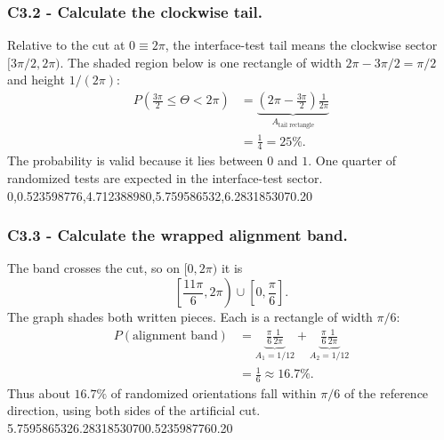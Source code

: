 	\subsubsection*{C3.2 - Calculate the clockwise tail.}
	\label{subsec:c3-uniform-sensor-b}
	Relative to the cut at $0\equiv2\pi$, the interface-test tail means the
	clockwise sector $[3\pi/2,2\pi)$.  The shaded region below is one rectangle of
	width $2\pi-3\pi/2=\pi/2$ and height $1/(2\pi)$:
	\[
	\begin{aligned}
		P\left(\frac{3\pi}{2}\le\Theta<2\pi\right)
		&=\underbrace{\left(2\pi-\frac{3\pi}{2}\right)
			\frac1{2\pi}}_{A_{\text{tail rectangle}}}\\
		&=\frac14=25\%.
	\end{aligned}
	\]
	The probability is valid because it lies between $0$ and $1$.  One quarter of
	randomized tests are expected in the interface-test sector.
	\begingroup
	{0,0.523598776,4.712388980,5.759586532,6.283185307}{0.20}
	\endgroup
	
	\subsubsection*{C3.3 - Calculate the wrapped alignment band.}
	\label{subsec:c3-uniform-sensor-c}
	The band crosses the cut, so on $[0,2\pi)$ it is
	\[
	\left[\frac{11\pi}{6},2\pi\right)
	\cup\left[0,\frac\pi6\right].
	\]
	The graph shades both written pieces.  Each is a rectangle of width $\pi/6$:
	\[
	\begin{aligned}
		P(\text{alignment band})
		&=\underbrace{\frac\pi6\frac1{2\pi}}_{A_1=1/12}
		+\underbrace{\frac\pi6\frac1{2\pi}}_{A_2=1/12}\\
		&=\frac16\approx16.7\%.
	\end{aligned}
	\]
	Thus about $16.7\%$ of randomized orientations fall within $\pi/6$ of the
	reference direction, using both sides of the artificial cut.
	\begingroup
	{5.759586532}{6.283185307}{0}{0.523598776}{0.20}
	\endgroup
	
